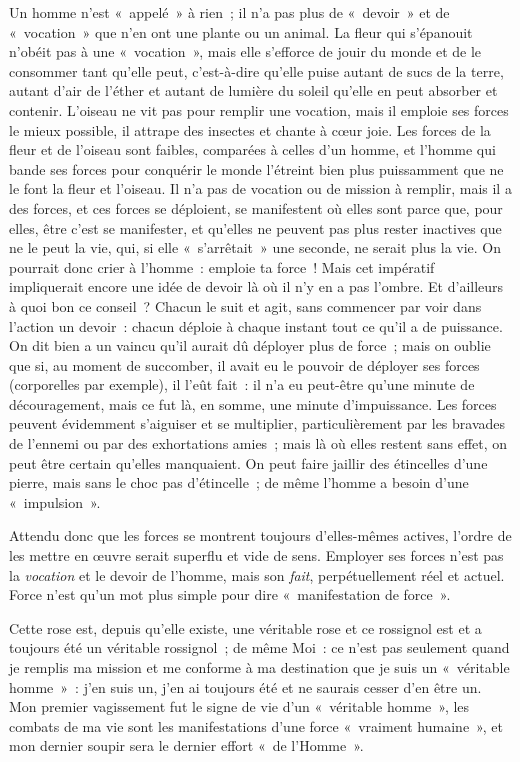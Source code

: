 \documentclass[french,twoside]{book} %
\begin{document}
Un homme n’est « appelé » à rien ; il n’a pas plus de « devoir » et de « vocation » que n’en ont une plante ou un animal. La fleur qui s’épanouit n’obéit pas à une « vocation », mais elle s’efforce de jouir du monde et de le consommer tant qu’elle peut, c’est-à-dire qu’elle puise autant de sucs de la terre, autant d’air de l’éther et autant de lumière du soleil qu’elle en peut absorber et contenir. L’oiseau ne vit pas pour remplir une vocation, mais il emploie ses forces le mieux possible, il attrape des insectes et chante à cœur joie. Les forces de la fleur et de l’oiseau sont faibles, comparées à celles d’un homme, et l’homme qui bande ses forces pour conquérir le monde l’étreint bien plus puissamment que ne le font la fleur et l’oiseau. Il n’a pas de vocation ou de mission à remplir, mais il a des forces, et ces forces se déploient, se manifestent où elles sont parce que, pour elles, être  c’est se manifester, et qu’elles ne peuvent pas plus rester inactives que ne le peut la vie, qui, si elle « s’arrêtait » une seconde, ne serait plus la vie. On pourrait donc crier à l’homme : emploie ta force ! Mais cet impératif impliquerait encore une idée de devoir là où il n’y en a pas l’ombre. Et d’ailleurs à quoi bon ce conseil ? Chacun le suit et agit, sans commencer par voir dans l’action un devoir : chacun déploie à chaque instant tout ce qu’il a de puissance. On dit bien a un vaincu qu’il aurait dû déployer plus de force ; mais on oublie que si, au moment de succomber, il avait eu le pouvoir de déployer ses forces (corporelles par exemple), il l’eût fait : il n’a eu peut-être qu’une minute de découragement, mais ce fut là, en somme, une minute d’impuissance. Les forces peuvent évidemment s’aiguiser et se multiplier, particulièrement par les bravades de l’ennemi ou par des exhortations amies ; mais là où elles restent sans effet, on peut être certain qu’elles manquaient. On peut faire jaillir des étincelles d’une pierre, mais sans le choc pas d’étincelle ; de même l’homme a besoin d’une « impulsion ».\par
Attendu donc que les forces se montrent toujours d’elles-mêmes actives, l’ordre de les mettre en œuvre serait superflu et vide de sens. Employer ses forces n’est pas la \emph{vocation} et le devoir de l’homme, mais son \emph{fait}, perpétuellement réel et actuel. Force n’est qu’un mot plus simple pour dire « manifestation de force ».\par
Cette rose est, depuis qu’elle existe, une véritable rose et ce rossignol est et a toujours été un véritable rossignol ; de même Moi : ce n’est pas seulement quand je remplis ma mission et me conforme à ma destination que je suis un « véritable homme » : j’en suis un, j’en ai toujours été et ne saurais cesser d’en être un. Mon premier vagissement fut le signe de vie d’un « véritable homme », les combats de ma vie sont les manifestations d’une force « vraiment humaine », et mon dernier soupir sera le dernier effort « de l’Homme ».\par
\end{document}
